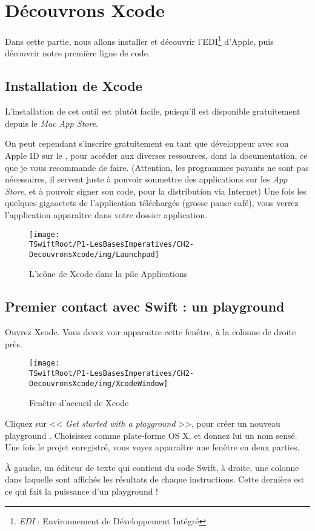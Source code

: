 \chapter{Découvrons Xcode}
Dans cette partie, nous allons installer et découvrir l'EDI\footnote{\emph{EDI} : Environnement de Développement Intégré} d’Apple,
puis découvrir notre première ligne de code. %
\section{Installation de Xcode}
L'installation de cet outil est plutôt facile,
puisqu’il est disponible gratuitement depuis le \emph{Mac App Store}.
 
On peut cependant s'inscrire gratuitement en tant que développeur
avec son Apple ID sur le
,
pour accéder aux diverses ressources, dont la documentation,
ce que je vous recommande de faire.
(Attention, les programmes payants ne sont pas nécessaires,
il servent juste à pouvoir soumettre des applications sur les \emph{App Store},
et à pouvoir signer son code, pour la distribution via Internet)
Une fois les quelques gigaoctets de l'application téléchargés
(grosse pause café),
vous verrez l'application apparaître dans votre dossier application.
\begin{figure}[H]
\centering
\texttt{[image: \\TSwiftRoot/P1-LesBasesImperatives/CH2-DecouvronsXcode/img/Launchpad]}
\caption{L'icône de Xcode dans la pile \og Applications \fg{}}
\end{figure}

\section{Premier contact avec Swift : un playground}
Ouvrez Xcode.
Vous devez voir apparaitre cette fenêtre, à la colonne de droite près.
\begin{figure}[H]
\centering
\texttt{[image: \\TSwiftRoot/P1-LesBasesImperatives/CH2-DecouvronsXcode/img/XcodeWindow]}
\caption{Fenêtre d'accueil de Xcode}
\end{figure}

Cliquez sur << \emph{Get started with a playground} >>,
pour créer un nouveau \og playground \fg{}.
Choisissez comme plate-forme OS X, et donnez lui un nom sensé.
Une fois le projet enregistré, vous voyez apparaître une fenêtre en deux parties.

À gauche, un éditeur de texte qui contient du code Swift,
à droite, une colonne dans laquelle sont affichés
les résultats de chaque instructions.
Cette dernière est ce qui fait la puissance d'un \og playground \fg{} !


